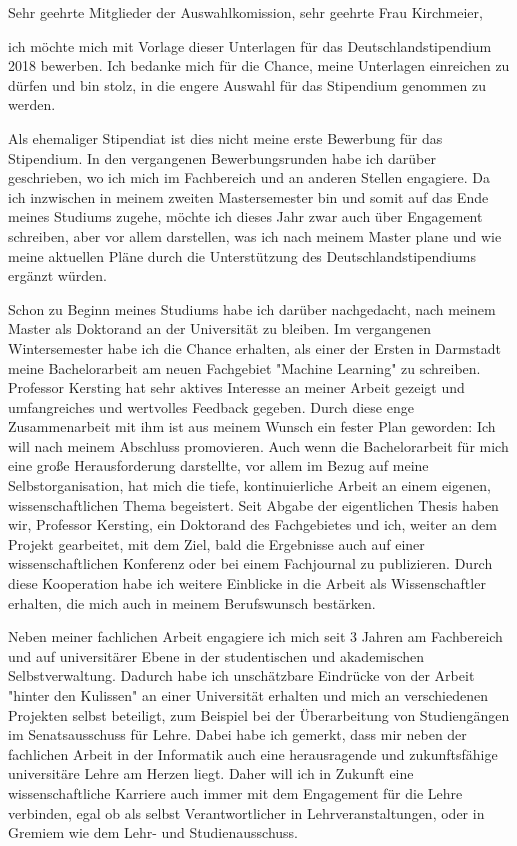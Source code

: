 
Sehr geehrte Mitglieder der Auswahlkomission, sehr geehrte Frau Kirchmeier,

ich möchte mich mit Vorlage dieser Unterlagen für das Deutschlandstipendium 2018 bewerben.
Ich bedanke mich für die Chance, meine Unterlagen einreichen zu dürfen und bin stolz, in die engere Auswahl für das Stipendium genommen zu werden.

Als ehemaliger Stipendiat ist dies nicht meine erste Bewerbung für das Stipendium.
In den vergangenen Bewerbungsrunden habe ich darüber geschrieben, wo ich mich im Fachbereich und an anderen Stellen engagiere.
Da ich inzwischen in meinem zweiten Mastersemester bin und somit auf das Ende meines Studiums zugehe, möchte ich dieses Jahr zwar auch über Engagement schreiben, aber vor allem darstellen, was ich nach meinem Master plane und wie meine aktuellen Pläne durch die Unterstützung des Deutschlandstipendiums ergänzt würden.

Schon zu Beginn meines Studiums habe ich darüber nachgedacht, nach meinem Master als Doktorand an der Universität zu bleiben.
Im vergangenen Wintersemester habe ich die Chance erhalten, als einer der Ersten in Darmstadt meine Bachelorarbeit am neuen Fachgebiet "Machine Learning" zu schreiben.
Professor Kersting hat sehr aktives Interesse an meiner Arbeit gezeigt und umfangreiches und wertvolles Feedback gegeben.
Durch diese enge Zusammenarbeit mit ihm ist aus meinem Wunsch ein fester Plan geworden: Ich will nach meinem Abschluss promovieren.
Auch wenn die Bachelorarbeit für mich eine große Herausforderung darstellte, vor allem im Bezug auf meine Selbstorganisation, hat mich die tiefe, kontinuierliche Arbeit an einem eigenen, wissenschaftlichen Thema begeistert.
Seit Abgabe der eigentlichen Thesis haben wir, Professor Kersting, ein Doktorand des Fachgebietes und ich, weiter an dem Projekt gearbeitet, mit dem Ziel, bald die Ergebnisse auch auf einer wissenschaftlichen Konferenz oder bei einem Fachjournal zu publizieren.
Durch diese Kooperation habe ich weitere Einblicke in die Arbeit als Wissenschaftler erhalten, die mich auch in meinem Berufswunsch bestärken.

Neben meiner fachlichen Arbeit engagiere ich mich seit 3 Jahren am Fachbereich und auf universitärer Ebene in der studentischen und akademischen Selbstverwaltung.
Dadurch habe ich unschätzbare Eindrücke von der Arbeit "hinter den Kulissen" an einer Universität erhalten und mich an verschiedenen Projekten selbst beteiligt, zum Beispiel bei der Überarbeitung von Studiengängen im Senatsausschuss für Lehre.
Dabei habe ich gemerkt, dass mir neben der fachlichen Arbeit in der Informatik auch eine herausragende und zukunftsfähige universitäre Lehre am Herzen liegt.
Daher will ich in Zukunft eine wissenschaftliche Karriere auch immer mit dem Engagement für die Lehre verbinden, egal ob als selbst Verantwortlicher in Lehrveranstaltungen, oder in Gremiem wie dem Lehr- und Studienausschuss.

